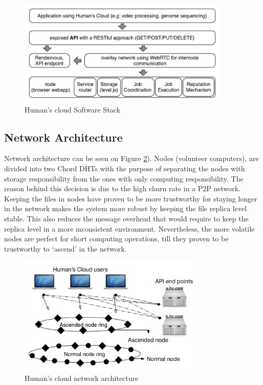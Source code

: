 \begin{figure}[h!]
  \centering
  \includegraphics[width=0.9\textwidth]{img/softwarestack.jpg}
  \caption{Human's cloud Software Stack}
  \label{fig:softwarestack}
\end{figure}


\subsection{Network Architecture}

Network architecture can be seen on Figure \ref{fig:overallarchitecture}). Nodes (volunteer computers), are divided into two Chord DHTs with the purpose of separating the nodes with storage responsibility from the ones with only computing responsibility. The reason behind this decision is due to the high churn rate in a P2P network. Keeping the files in nodes have proven to be more trustworthy for staying longer in the network makes the system more robust by keeping the file replica level stable. This also reduces the message overhead that would require to keep the replica level in a more inconsistent environment. Nevertheless, the more volatile nodes are perfect for short computing operations, till they proven to be trustworthy to `ascend' in the network.

\begin{figure}[h!]
  \centering
  \includegraphics[width=0.8\textwidth]{img/overall.jpg}
  \caption{Human's cloud network architecture}
  \label{fig:overallarchitecture}
\end{figure}

